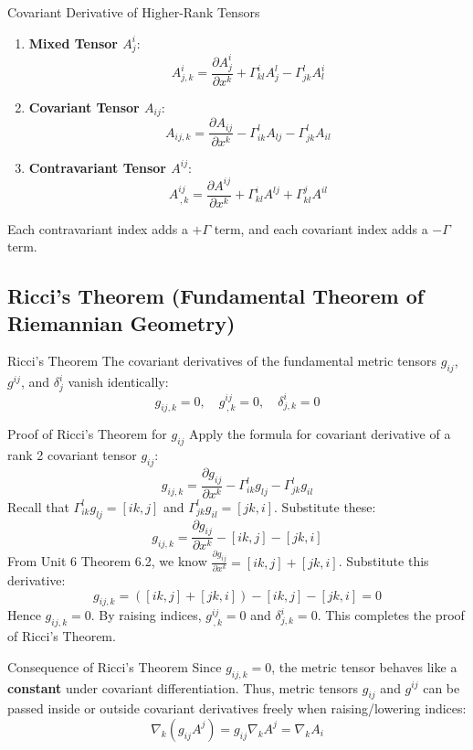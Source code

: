 \documentclass[11pt,a4paper]{article}
\begin{document}
\begin{definitionbox}{Covariant Derivative of Higher-Rank Tensors}
\begin{enumerate}
    \item \textbf{Mixed Tensor $A^i_j$}:
    \[
    A^i_{j,k} = \frac{\partial A^i_j}{\partial x^k} + \Gamma^i_{kl} A^l_j - \Gamma^l_{jk} A^i_l
    \]
    \item \textbf{Covariant Tensor $A_{ij}$}:
    \[
    A_{ij,k} = \frac{\partial A_{ij}}{\partial x^k} - \Gamma^l_{ik} A_{lj} - \Gamma^l_{jk} A_{il}
    \]
    \item \textbf{Contravariant Tensor $A^{ij}$}:
    \[
    A^{ij}_{\, ,k} = \frac{\partial A^{ij}}{\partial x^k} + \Gamma^i_{kl} A^{lj} + \Gamma^j_{kl} A^{il}
    \]
\end{enumerate}
Each contravariant index adds a $+\Gamma$ term, and each covariant index adds a $-\Gamma$ term.
\end{definitionbox}

\subsection{Ricci's Theorem (Fundamental Theorem of Riemannian Geometry)}
\begin{theorembox}{Ricci's Theorem}
The covariant derivatives of the fundamental metric tensors $g_{ij}$, $g^{ij}$, and $\delta^i_j$ vanish identically:
\[
g_{ij,k} = 0, \quad g^{ij}_{\, ,k} = 0, \quad \delta^i_{j,k} = 0
\]
\end{theorembox}
\begin{proofbox}{Proof of Ricci's Theorem for $g_{ij}$}
Apply the formula for covariant derivative of a rank 2 covariant tensor $g_{ij}$:
\[
g_{ij,k} = \frac{\partial g_{ij}}{\partial x^k} - \Gamma^l_{ik} g_{lj} - \Gamma^l_{jk} g_{il}
\]
Recall that $\Gamma^l_{ik} g_{lj} = [ik, j]$ and $\Gamma^l_{jk} g_{il} = [jk, i]$. Substitute these:
\[
g_{ij,k} = \frac{\partial g_{ij}}{\partial x^k} - [ik, j] - [jk, i]
\]
From Unit 6 Theorem 6.2, we know $\frac{\partial g_{ij}}{\partial x^k} = [ik, j] + [jk, i]$.
Substitute this derivative:
\[
g_{ij,k} = ([ik, j] + [jk, i]) - [ik, j] - [jk, i] = 0
\]
Hence $g_{ij,k} = 0$. By raising indices, $g^{ij}_{\, ,k} = 0$ and $\delta^i_{j,k} = 0$. This completes the proof of Ricci's Theorem.
\end{proofbox}

\begin{importantbox}{Consequence of Ricci's Theorem}
Since $g_{ij,k} = 0$, the metric tensor behaves like a \textbf{constant} under covariant differentiation. Thus, metric tensors $g_{ij}$ and $g^{ij}$ can be passed inside or outside covariant derivatives freely when raising/lowering indices:
\[
\nabla_k (g_{ij} A^j) = g_{ij} \nabla_k A^j = \nabla_k A_i
\]
\end{importantbox}
\end{document}
